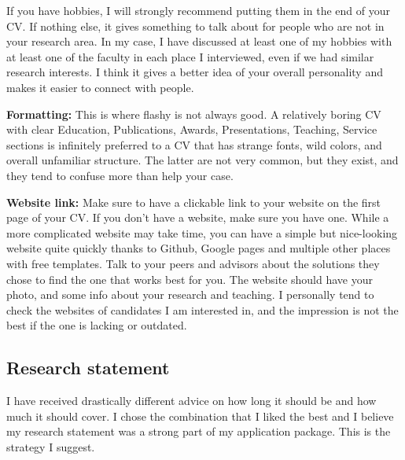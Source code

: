 \documentclass{article}
\begin{document}
If you have hobbies, I will strongly recommend putting them in the end of your CV. If nothing else, it gives something to talk about for people who are not in your research area. In my case, I have discussed at least one of my hobbies with at least one of the faculty in each place I interviewed, even if we had similar research interests. I think it gives a better idea of your overall personality and makes it easier to connect with people.

{\color{red} \textbf{Formatting:} This is where flashy is not always good. A relatively boring CV with clear Education, Publications, Awards, Presentations, Teaching, Service sections is infinitely preferred to a CV that has strange fonts, wild colors, and overall unfamiliar structure. The latter are not very common, but they exist, and they tend to confuse more than help your case.}

{\color{red} \textbf{Website link:} Make sure to have a clickable link to your website on the first page of your CV. If you don't have a website, make sure you have one.  While a more complicated website may take time, you can have a simple but nice-looking website quite quickly thanks to Github, Google pages and multiple other places with free templates. Talk to your peers and advisors about the solutions they chose to find the one that works best for you. The website should have your photo, and some info about your research and teaching. I personally tend to check the websites of candidates I am interested in, and the impression is not the best if the one is lacking or outdated.}

\subsection{Research statement}

I have received drastically different advice on how long it should be and how much it should cover. I chose the combination that I liked the best and I believe my research statement was a strong part of my application package. This is the strategy I suggest.
\end{document}
